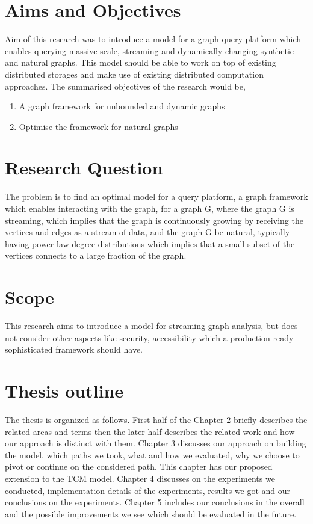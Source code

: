 \documentclass[12pt]{report}
\numberwithin{figure}{section}
\numberwithin{table}{section}
\begin{document}
\section{Aims and Objectives} 
Aim of this research was to introduce a model for a graph query platform which enables querying massive scale, streaming and dynamically changing synthetic  and natural graphs. This model should be able to work on top of existing distributed storages and make use of existing distributed computation approaches. The summarised objectives of the research would be, 

\begin{enumerate}
\item A graph framework for unbounded and dynamic graphs
\item Optimise the framework for natural graphs
\end{enumerate}

\section{Research Question}
The problem is to find an optimal model for a query platform, a graph framework which enables interacting with the graph, for a graph G, where the graph G is streaming, which implies that the graph is continuously growing by receiving the vertices and edges as a stream of data, and the graph G be natural, typically having power-law degree distributions which implies that a small subset of the vertices connects to a large fraction of the graph.

\section{Scope}
This research aims to introduce a model for streaming graph analysis, but does not consider other aspects like security, accessibility which  a production ready sophisticated framework should have.

\section{Thesis outline}
The thesis is organized as follows. First half of the Chapter 2 briefly describes the related areas and terms then the later half describes the related work and how our approach is distinct with them. Chapter 3 discusses our approach on building the model, which paths we took, what and how we evaluated, why we choose to pivot or continue on the considered path. This chapter has our proposed extension to the TCM model. Chapter 4 discusses on the experiments we conducted, implementation details of the experiments, results we got and our conclusions on the experiments. Chapter 5 includes our conclusions in the overall and the possible improvements we see which should be evaluated in the future.
\end{document}
